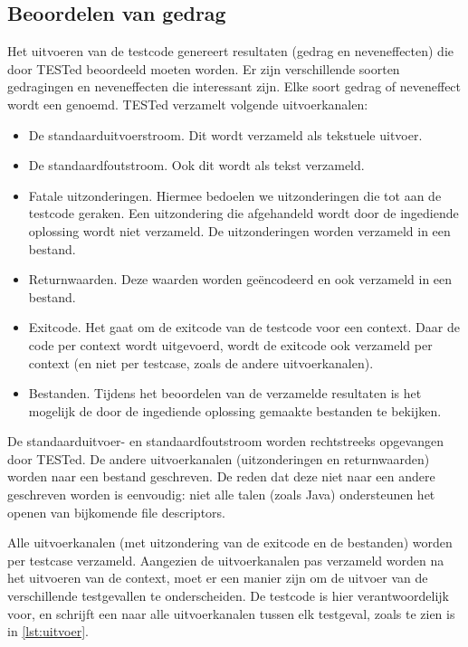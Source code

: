 \subsection{Beoordelen van gedrag}\label{subsec:beoordelen-van-gedrag}

Het uitvoeren van de testcode genereert resultaten (gedrag en neveneffecten) die door TESTed beoordeeld moeten worden.
Er zijn verschillende soorten gedragingen en neveneffecten die interessant zijn.
Elke soort gedrag of neveneffect wordt een  genoemd.
TESTed verzamelt volgende uitvoerkanalen:
\begin{itemize}
    \item De standaarduitvoerstroom.
    Dit wordt verzameld als tekstuele uitvoer.
    \item De standaardfoutstroom.
    Ook dit wordt als tekst verzameld.
    \item Fatale uitzonderingen.
    Hiermee bedoelen we uitzonderingen die tot aan de testcode geraken.
    Een uitzondering die afgehandeld wordt door de ingediende oplossing wordt niet verzameld.
    De uitzonderingen worden verzameld in een bestand.
    \item Returnwaarden.
    Deze waarden worden geëncodeerd en ook verzameld in een bestand.
    \item Exitcode.
    Het gaat om de exitcode van de testcode voor een context.
    Daar de code per context wordt uitgevoerd, wordt de exitcode ook verzameld per context (en niet per testcase, zoals de andere uitvoerkanalen).
    \item Bestanden.
    Tijdens het beoordelen van de verzamelde resultaten is het mogelijk de door de ingediende oplossing gemaakte bestanden te bekijken.
\end{itemize}

De standaarduitvoer- en standaardfoutstroom worden rechtstreeks opgevangen door TESTed.
De andere uitvoerkanalen (uitzonderingen en returnwaarden) worden naar een bestand geschreven.
De reden dat deze niet naar een andere  geschreven worden is eenvoudig: niet alle talen (zoals Java) ondersteunen het openen van bijkomende file descriptors.

Alle uitvoerkanalen (met uitzondering van de exitcode en de bestanden) worden per testcase verzameld.
Aangezien de uitvoerkanalen pas verzameld worden na het uitvoeren van de context, moet er een manier zijn om de uitvoer van de verschillende testgevallen te onderscheiden.
De testcode is hier verantwoordelijk voor, en schrijft een  naar alle uitvoerkanalen tussen elk testgeval, zoals te zien is in \cref{lst:uitvoer}.

